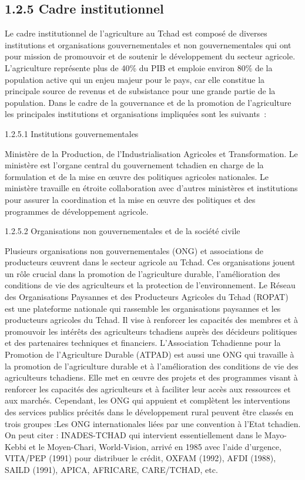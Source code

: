 \documentclass[12pt,oneside]{report}
\begin{document}
\subsection{1.2.5 Cadre institutionnel}
Le cadre institutionnel de l'agriculture au Tchad est composé de diverses institutions et organisations gouvernementales et non gouvernementales qui ont pour mission de promouvoir et de soutenir le développement du secteur agricole. L'agriculture représente plus de 40\% du PIB et emploie environ 80\% de la population active qui un enjeu majeur pour le pays, car elle constitue la principale source de revenus et de subsistance pour une grande partie de la population. Dans le cadre de la gouvernance et de la promotion de l’agriculture les principales institutions et organisations impliquées sont les suivants :

1.2.5.1 Institutions gouvernementales

Ministère de la Production, de l'Industrialisation Agricoles et Transformation. Le ministère est l'organe central du gouvernement tchadien en charge de la formulation et de la mise en œuvre des politiques agricoles nationales. Le ministère travaille en étroite collaboration avec d'autres ministères et institutions pour assurer la coordination et la mise en œuvre des politiques et des programmes de développement agricole.

1.2.5.2 Organisations non gouvernementales et de la société civile

Plusieurs organisations non gouvernementales (ONG) et associations de producteurs œuvrent dans le secteur agricole au Tchad. Ces organisations jouent un rôle crucial dans la promotion de l'agriculture durable, l'amélioration des conditions de vie des agriculteurs et la protection de l'environnement. Le Réseau des Organisations Paysannes et des Producteurs Agricoles du Tchad (ROPAT) est une plateforme nationale qui rassemble les organisations paysannes et les producteurs agricoles du Tchad. Il vise à renforcer les capacités des membres et à promouvoir les intérêts des agriculteurs tchadiens auprès des décideurs politiques et des partenaires techniques et financiers. L’Association Tchadienne pour la Promotion de l'Agriculture Durable (ATPAD) est aussi une ONG qui travaille à la promotion de l'agriculture durable et à l'amélioration des conditions de vie des agriculteurs tchadiens. Elle met en œuvre des projets et des programmes visant à renforcer les capacités des agriculteurs et à faciliter leur accès aux ressources et aux marchés. Cependant, les ONG qui appuient et complètent les interventions des services publics précités dans le développement rural peuvent être classés en trois groupes :Les ONG internationales liées par une convention à l’Etat tchadien. On peut citer : INADES-TCHAD qui intervient essentiellement dans le Mayo-Kebbi et le Moyen-Chari, World-Vision, arrivé en 1985 avec l’aide d’urgence, VITA/PEP (1991) pour distribuer le crédit, OXFAM (1992), AFDI (1988), SAILD (1991), APICA, AFRICARE, CARE/TCHAD, etc.
\end{document}
